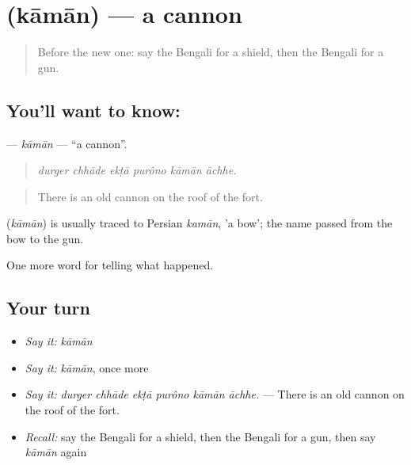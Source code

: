 \section[\texorpdfstring{\bn{কামান} (kāmān)}{কামান (kāmān)}]{ (kāmān) — a cannon}

\label{lesson:BN-C315-kaman}



\begin{quote}
Before the new one: say the Bengali for a shield, then the Bengali for a gun.
\end{quote}

\subsection*{You'll want to know: }
\textbf{} — \emph{kāmān} — \textquotedblleft{}a cannon\textquotedblright{}.

\begin{quote}
     
\end{quote}

\begin{quote}
\emph{durger chhāde ekṭā purôno kāmān āchhe.}
\end{quote}

\begin{quote}
There is an old cannon on the roof of the fort.
\end{quote}

\begin{cousinweb}
\textbf{} (\emph{kāmān}) is usually traced to Persian \emph{kamān}, 'a bow'; the name passed from the bow to the gun.
\end{cousinweb}

\begin{grammarlens}[title={What you've built}]
One more word for telling what happened.
\end{grammarlens}

\subsection*{Your turn}
\begin{itemize}
\raggedright
  \item \emph{Say it:} \emph{kāmān}
  \item \emph{Say it:} \emph{kāmān}, once more
  \item \emph{Say it:} \emph{durger chhāde ekṭā purôno kāmān āchhe.} — There is an old cannon on the roof of the fort.
  \item \emph{Recall:} say the Bengali for a shield, then the Bengali for a gun, then say \emph{kāmān} again
\end{itemize}

